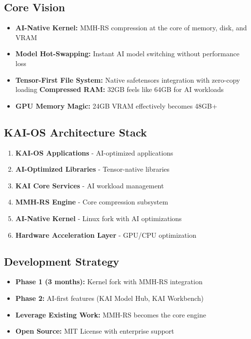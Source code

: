 \documentclass[12pt,a4paper]{article}
\begin{document}
\subsection{Core Vision}
\begin{itemize}
    \item \textbf{AI-Native Kernel:} MMH-RS compression at the core of memory, disk, and VRAM
    \item \textbf{Model Hot-Swapping:} Instant AI model switching without performance loss
    \item \textbf{Tensor-First File System:} Native safetensors integration with zero-copy loading
    \textbf{Compressed RAM:} 32GB feels like 64GB for AI workloads
    \item \textbf{GPU Memory Magic:} 24GB VRAM effectively becomes 48GB+
\end{itemize}

\subsection{KAI-OS Architecture Stack}
\begin{enumerate}
    \item \textbf{KAI-OS Applications} - AI-optimized applications
    \item \textbf{AI-Optimized Libraries} - Tensor-native libraries
    \item \textbf{KAI Core Services} - AI workload management
    \item \textbf{MMH-RS Engine} - Core compression subsystem
    \item \textbf{AI-Native Kernel} - Linux fork with AI optimizations
    \item \textbf{Hardware Acceleration Layer} - GPU/CPU optimization
\end{enumerate}

\subsection{Development Strategy}
\begin{itemize}
    \item \textbf{Phase 1 (3 months):} Kernel fork with MMH-RS integration
    \item \textbf{Phase 2:} AI-first features (KAI Model Hub, KAI Workbench)
    \item \textbf{Leverage Existing Work:} MMH-RS becomes the core engine
    \item \textbf{Open Source:} MIT License with enterprise support
\end{itemize}
\end{document}
